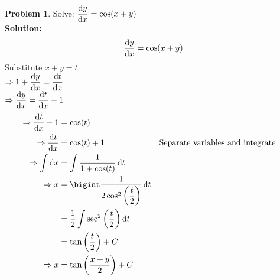 \documentclass[14]{article}
\theoremstyle{definition}
\newtheorem{prob}{Problem}
\theoremstyle{case}
\begin{document}
\begin{prob}
Solve: $\dfrac{\dif y}{\dif x} = \cos(x+y)$\\
\textbf{Solution:}
\[\dfrac{\dif y}{\dif x} = \cos(x+y)\]
Substitute $x + y = t$\\
$\Rightarrow 1 + \dfrac{\dif y}{\dif x} = \dfrac{\dif t}{\dif x}$\\
$\Rightarrow \dfrac{\dif y}{\dif x} = \dfrac{\dif t}{\dif x} - 1$
\begin{align*}
\Rightarrow \dfrac{\dif t}{\dif x} - 1 &= \cos(t)\\
\Rightarrow \dfrac{\dif t}{\dif x} &= \cos(t) + 1 && \text{Separate variables and integrate}\\
\Rightarrow \int\dif x &= \int \dfrac1{1 + \cos(t)} \dif t\\
\Rightarrow x &= \bigint \dfrac1{2\cos^2\left(\dfrac{t}{2}\right)} \dif t\\
&= \dfrac12 \int\sec^2\left(\dfrac{t}2\right)\dif t\\
&= \tan\left(\dfrac{t}2\right) + C\\
\Rightarrow x &= \tan\left(\dfrac{x+y}2\right) + C\\
\end{align*}
\end{prob}
\pagebreak
\end{document}
